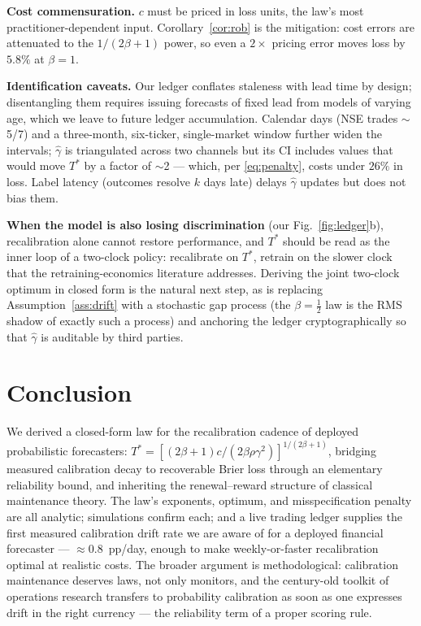 \documentclass[conference]{IEEEtran}
\begin{document}
\textbf{Cost commensuration.} $c$ must be priced in loss units, the law's
most practitioner-dependent input. Corollary~\ref{cor:rob} is the mitigation:
cost errors are attenuated to the $1/(2\beta+1)$ power, so even a
$2\times$ pricing error moves loss by $5.8\%$ at $\beta{=}1$.

\textbf{Identification caveats.} Our ledger conflates staleness with lead
time by design; disentangling them requires issuing forecasts of fixed lead
from models of varying age, which we leave to future ledger accumulation.
Calendar days (NSE trades $\sim$5/7) and a three-month, six-ticker,
single-market window further widen the intervals; $\hat\gamma$ is
triangulated across two channels but its CI includes values that would move
$T^{*}$ by a factor of $\sim$2 --- which, per \eqref{eq:penalty}, costs under
$26\%$ in loss. Label latency (outcomes resolve $k$ days late) delays
$\hat\gamma$ updates but does not bias them.

\textbf{When the model is also losing discrimination} (our
Fig.~\ref{fig:ledger}b), recalibration alone cannot restore performance, and
$T^{*}$ should be read as the inner loop of a two-clock policy:
recalibrate on $T^{*}$, retrain on the slower clock that the
retraining-economics literature \cite{mahadevan2024cara,retrainfreq2025}
addresses. Deriving the joint two-clock optimum in closed form is the natural
next step, as is replacing Assumption~\ref{ass:drift} with a stochastic gap
process (the $\beta{=}\tfrac12$ law is the RMS shadow of exactly such a
process) and anchoring the ledger cryptographically so that $\hat\gamma$
is auditable by third parties.

\section{Conclusion}

We derived a closed-form law for the recalibration cadence of deployed
probabilistic forecasters: $T^{*}=[(2\beta+1)c/(2\beta\rho\gamma^{2})]^{1/(2\beta+1)}$,
bridging measured calibration decay to recoverable Brier loss through an
elementary reliability bound, and inheriting the renewal--reward structure of
classical maintenance theory. The law's exponents, optimum, and
misspecification penalty are all analytic; simulations confirm each; and a
live trading ledger supplies the first measured calibration drift rate we are
aware of for a deployed financial forecaster --- $\approx0.8$~pp/day, enough
to make weekly-or-faster recalibration optimal at realistic costs. The
broader argument is methodological: calibration maintenance deserves laws,
not only monitors, and the century-old toolkit of operations research
transfers to probability calibration as soon as one expresses drift in the
right currency --- the reliability term of a proper scoring rule.
\end{document}
